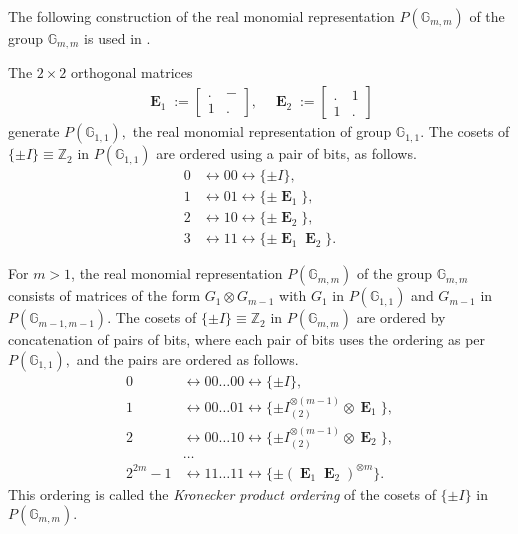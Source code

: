 \documentclass[12pt,a4paper]{article}
\newcommand{\mb}[1]{\mathbb{#1}}
\newcommand{\mf}[1]{\mathbf{#1}}
\newcommand{\oE}{\mf{\operatorname{E}}}
\newcommand{\G}{\mb{G}}
\newcommand{\Z}{\mb{Z}}
\newcommand{\Rep}{P}
\begin{document}
The following construction of the real monomial representation $\Rep(\G_{m,m})$
of the group $\G_{m,m}$ is used in \cite{Leo14Constructions}.

The $2 \times 2$ orthogonal matrices
\begin{align*}
\oE_1 :=
\left[
\begin{array}{cc}
. & - \\
1 & .
\end{array}
\right],
\quad
\oE_2 :=
\left[
\begin{array}{cc}
. & 1 \\
1 & .
\end{array}
\right]
\end{align*}
generate $\Rep(\G_{1,1}),$ the real monomial representation of group $\G_{1,1}.$
The cosets of $\{\pm I\} \equiv \Z_2$ in $\Rep(\G_{1,1})$ are
ordered using a pair of bits, as follows.
\begin{align*}
0 &\leftrightarrow 00 \leftrightarrow \{ \pm I \},
\\
1 &\leftrightarrow 01 \leftrightarrow \{ \pm \oE_1 \},
\\
2 &\leftrightarrow 10 \leftrightarrow \{ \pm \oE_2 \},
\\
3 &\leftrightarrow 11 \leftrightarrow \{ \pm \oE_1 \oE_2 \}.
\end{align*}

For $m > 1$,
the real monomial representation $\Rep(\G_{m,m})$ of the 
group $\G_{m,m}$ consists of matrices of the form $G_1 \otimes G_{m-1}$
with $G_1$ in $\Rep(\G_{1,1})$ and $G_{m-1}$ in $\Rep(\G_{m-1,m-1}).$
The cosets of $\{\pm I\} \equiv \Z_2$ in $\Rep(\G_{m,m})$ are
ordered by concatenation of pairs of bits, 
where each pair of bits uses the ordering as per $\Rep(\G_{1,1}),$
and the pairs are ordered as follows.
\begin{align*}
0 &\leftrightarrow 00 \ldots 00 \leftrightarrow \{ \pm I \},
\\
1 &\leftrightarrow 00 \ldots 01 \leftrightarrow \{ \pm I_{(2)}^{\otimes {(m-1)}} \otimes  \oE_1 \},
\\
2 &\leftrightarrow 00 \ldots 10 \leftrightarrow \{ \pm I_{(2)}^{\otimes {(m-1)}} \otimes  \oE_2 \},
\\
&\ldots
\\
2^{2m} - 1 &\leftrightarrow 11 \ldots 11 \leftrightarrow \{ \pm (\oE_1 \oE_2)^{\otimes {m}} \}.
\end{align*}
This ordering is called 
the \emph{Kronecker product ordering} of the cosets of $\{\pm I\}$ in $\Rep(\G_{m,m}).$
\end{document}
